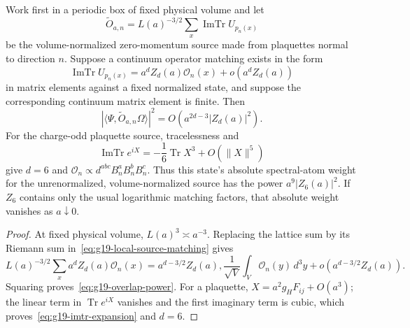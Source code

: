 \begin{conditional}
\label{cond:g19-bare-residue}
Work first in a periodic box of fixed physical volume and let
\[
 \widetilde O_{a,n}=L(a)^{-3/2}\sum_x
       \operatorname{ImTr}U_{p_n(x)}
\]
be the volume-normalized zero-momentum source made from plaquettes normal to
direction $n$.  Suppose a continuum operator matching exists in the form
\begin{equation}
 \operatorname{ImTr}U_{p_n(x)}
 =a^d Z_d(a)\mathcal O_n(x)+o(a^dZ_d(a))
 \label{eq:g19-local-source-matching}
\end{equation}
in matrix elements against a fixed normalized state, and suppose the
corresponding continuum matrix element is finite.  Then
\begin{equation}
 \left|\langle\Psi,\widetilde O_{a,n}\Omega\rangle\right|^2
 =O\!\left(a^{2d-3}|Z_d(a)|^2\right).
 \label{eq:g19-overlap-power}
\end{equation}
For the charge-odd plaquette source, tracelessness and
\begin{equation}
 \operatorname{ImTr}e^{iX}
 =-\frac16\operatorname{Tr}X^3+O(\|X\|^5)
 \label{eq:g19-imtr-expansion}
\end{equation}
give $d=6$ and
$\mathcal O_n\propto d^{abc}B_n^aB_n^bB_n^c$.  Thus this state's absolute
spectral-atom weight for the unrenormalized, volume-normalized source has the
power $a^9|Z_6(a)|^2$.  If $Z_6$ contains only the usual logarithmic matching
factors, that absolute weight vanishes as $a\downarrow0$.
\end{conditional}

\begin{proof}
At fixed physical volume, $L(a)^3\asymp a^{-3}$.  Replacing the lattice sum
by its Riemann sum in~\eqref{eq:g19-local-source-matching} gives
\[
 L(a)^{-3/2}\sum_x a^dZ_d(a)\mathcal O_n(x)
 =a^{d-3/2}Z_d(a),
   \frac1{\sqrt{V}}\int_V\mathcal O_n(y)\,d^3y+o(a^{d-3/2}Z_d(a)).
\]
Squaring proves~\eqref{eq:g19-overlap-power}.  For a plaquette,
$X=a^2g_HF_{ij}+O(a^3)$; the linear term in
$\operatorname{Tr}e^{iX}$ vanishes and the first imaginary term is cubic,
which proves~\eqref{eq:g19-imtr-expansion} and $d=6$.
\end{proof}

